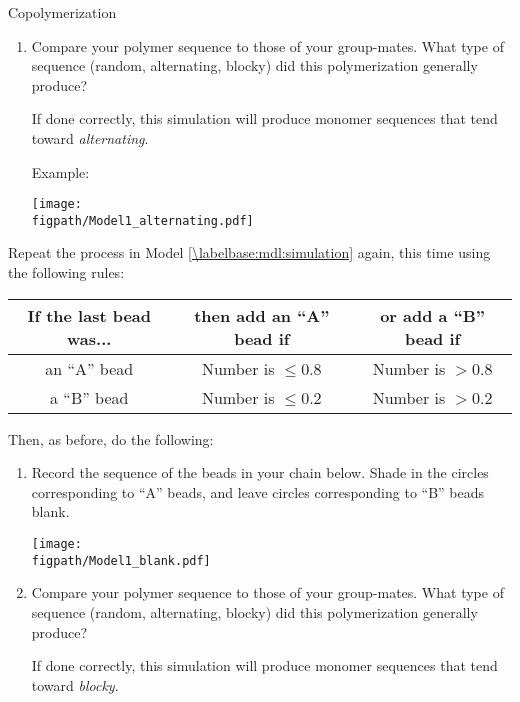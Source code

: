 \begin{activity}{Copolymerization}
\begin{ctqs}
\begin{enumerate}
			\item Compare your polymer sequence to those of your group-mates.  What type of sequence (random, alternating, blocky) did this polymerization generally produce?
			
				\begin{solution}[1.25in]{}
					If done correctly, this simulation will produce monomer sequences that tend toward \emph{alternating}.
			
			Example:
			
				\centerline{\texttt{[image: \\figpath/Model1\_alternating.pdf]}}
				\end{solution}
				
		\end{enumerate}
		
		\question \label{\labelbase:ctq:sim-blocky} Repeat the process in Model \ref{\labelbase:mdl:simulation} again, this time using the following rules:	\begin{center}
					\renewcommand{\arraystretch}{1.5}
					\begin{tabular}{|c|c|c|}
						\hline
						\textbf{If the last bead was...} &  \textbf{then add an ``A'' bead if} & \textbf{or add a ``B'' bead if}\\\hline
						 an ``A'' bead & Number is $\leq 0.8$ & Number is $> 0.8$ \\\hline
						 a ``B'' bead & Number is $\leq 0.2$ & Number is $> 0.2$ \\\hline
					\end{tabular}
					\end{center}
	
		Then, as before, do the following:
		\begin{enumerate}
			\item Record the sequence of the beads in your chain below.  Shade in the circles corresponding to ``A'' beads, and leave circles corresponding to ``B'' beads blank.
	
		\vspace{6pt}
		\centerline{\texttt{[image: \\figpath/Model1\_blank.pdf]}}
		
			\item Compare your polymer sequence to those of your group-mates.  What type of sequence (random, alternating, blocky) did this polymerization generally produce?
			
				\begin{solution}[1.5in]{}
					If done correctly, this simulation will produce monomer sequences that tend toward \emph{blocky}.
			

\end{solution}
\end{enumerate}
\end{ctqs}
\end{activity}
